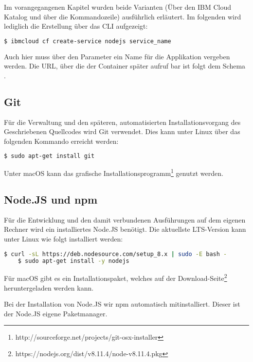 Im vorangegangenen Kapitel wurden beide Varianten (Über den IBM Cloud Katalog und über die Kommandozeile) ausführlich
erläutert. Im folgenden wird lediglich die Erstellung über das CLI aufgezeigt:

\begin{lstlisting}[language=bash, caption=Instanziierung der Node.JS Runtime, label=Instanziierung der Node.JS Runtime]
    $ ibmcloud cf create-service nodejs service_name
\end{lstlisting}

Auch hier muss über den Parameter  ein Name für die Applikation vergeben werden. Die URL, über die der
Container später aufruf bar ist folgt dem Schema .

\subsection{Git}
Für die Verwaltung und den späteren, automatisierten Installationsvorgang des Geschriebenen Quellcodes wird Git verwendet.
Dies kann unter Linux über das folgenden Kommando erreicht werden:

\begin{lstlisting}[language=bash, caption=Installation von Git, label=Installation von Git]
    $ sudo apt-get install git
\end{lstlisting}

Unter macOS kann das grafische Installationsprogramm\footnote{http://sourceforge.net/projects/git-osx-installer} genutzt
werden.

\subsection{Node.JS und npm}
Für die Entwicklung und den damit verbundenen Ausführungen auf dem eigenen Rechner wird ein installiertes Node.JS
benötigt. Die aktuellste LTS-Version kann unter Linux wie folgt installiert werden:

\begin{lstlisting}[language=bash, caption=Installation von Node.JS, label=Installation von Node.JS]
    $ curl -sL https://deb.nodesource.com/setup_8.x | sudo -E bash -
    $ sudo apt-get install -y nodejs
\end{lstlisting}

Für macOS gibt es ein Installationspaket, welches auf der Download-Seite\footnote{https://nodejs.org/dist/v8.11.4/node-v8.11.4.pkg}
heruntergeladen werden kann.

Bei der Installation von Node.JS wir npm automatisch mitinstalliert. Dieser ist der Node.JS eigene Paketmanager.